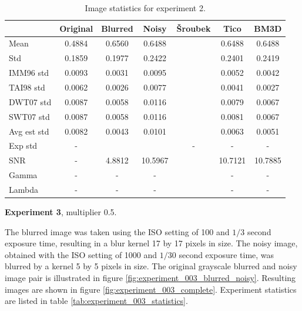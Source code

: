 \documentclass[12pt,notitlepage]{report}
\begin{document}
\begin{table}[htb]
  \centering
  \begin{tabular}{ | l | c | c | c | c | c | c | }
    \hline
		& Original & Blurred & Noisy & Šroubek & Tico & BM3D \\ \hline
	Mean & 0.4884 & 0.6560 & 0.6488 &  & 0.6488 & 0.6488 \\ \hline
	Std & 0.1859 & 0.1977 & 0.2422 &  & 0.2401 & 0.2419 \\ \hline
	IMM96 std & 0.0093 & 0.0031 & 0.0095 &  & 0.0052 & 0.0042 \\ \hline
	TAI98 std  & 0.0062 & 0.0026 & 0.0077 &  & 0.0041 & 0.0027 \\ \hline
	DWT07 std  & 0.0087 & 0.0058 & 0.0116 &  & 0.0079 & 0.0067 \\ \hline
	SWT07 std & 0.0087 & 0.0058 & 0.0116 &  & 0.0081 & 0.0067 \\ \hline
	Avg est std & 0.0082 & 0.0043 & 0.0101 &  & 0.0063 & 0.0051 \\ \hline
	Exp std & - &  &  & - & - & - \\ \hline
	SNR     & - & 4.8812 & 10.5967 &  & 10.7121 & 10.7885 \\ \hline
	Gamma & - & - & - &  & - & - \\ \hline
	Lambda & - & - & - &  & - & - \\ \hline

  \end{tabular}
  \caption{Image statistics for experiment 2.}
  \label{tab:experiment_002_statistics}
\end{table}

\noindent \textbf{Experiment 3}, multiplier 0.5.

The blurred image was taken using the ISO setting of 100 and $1/3$ second exposure time, resulting in a blur kernel 17 by 17 pixels in size. The noisy image, obtained with the ISO setting of 1000 and $1/30$ second exposure time, was blurred by a kernel 5 by 5 pixels in size. The original grayscale blurred and noisy image pair is illustrated in figure \ref{fig:experiment_003_blurred_noisy}. Resulting images are shown in figure \ref{fig:experiment_003_complete}. Experiment statistics are listed in table \ref{tab:experiment_003_statistics}.

\end{document}
